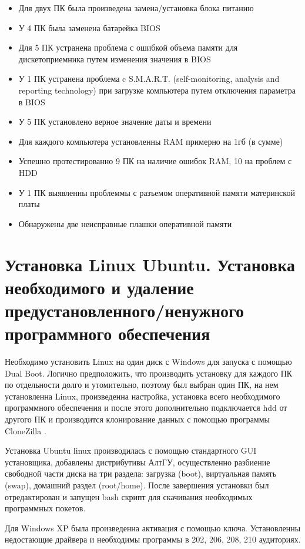 \documentclass[14pt, oneside]{altsu-report}
\begin{document}
\begin{itemize}
  \item Для двух ПК была произведена замена/установка блока питанию
  \item У 4 ПК была заменена батарейка BIOS
  \item Для 5 ПК устранена проблема с ошибкой объема памяти для дискетоприемника путем изменения значения в BIOS
  \item У 1 ПК устранена проблема c S.M.A.R.T. (self-monitoring, analysis and reporting technology) \cite{smart} при загрузке компьютера путем отключения параметра в BIOS
  \item У 5 ПК установлено верное значение даты и времени
  \item Для каждого компьютера установленны RAM примерно на 1гб (в сумме)
  \item Успешно протестированно 9 ПК на наличие ошибок RAM, 10 на проблем с HDD
  \item У 1 ПК выявленны проблеммы с разъемом оперативной памяти материнской платы
  \item Обнаружены две неисправные плашки оперативной памяти
\end{itemize}

\section{Установка Linux Ubuntu. Установка необходимого и удаление предустановленного/ненужного программного обеспечения}
Необходимо установить Linux на один диск с Windows для запуска с помощью Dual Boot. Логично предположить, что производить установку для каждого ПК по отдельности долго и утомительно, поэтому был выбран один ПК, на нем установленна Linux, произведенна настройка, установка всего необходимого программного обеспечения и после этого дополнительно подключается hdd от другого ПК и производится клонирование данных с помощью программы CloneZilla \cite{clonezilla}. 

Установка Ubuntu linux производилась с помощью стандартного GUI установщика, добавлены дистрибутивы АлтГУ, осуществленно разбиение свободной части диска на три раздела: загрузка (boot), виртуальная память (swap), домашний раздел (root/home). После завершения установки был отредактирован и запущен bash скрипт для скачивания необходимых программных покетов. 

Для Windows XP была произведенна активация с помощью ключа. 
Установленны недостающие драйвера и необходимы программы в 202, 206, 208, 210 аудиториях.
\end{document}
